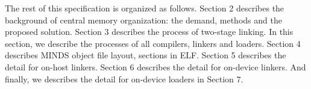The rest of this specification is organized as follows. Section 2 describes the background of central memory organization: the demand, methods and the proposed solution. Section 3 describes the process of two-stage linking. In this section, we describe the processes of all compilers, linkers and loaders. Section 4 describes MINDS object file layout, sections in ELF. Section 5 describes the detail for on-host linkers. Section 6 describes the detail for on-device linkers. And finally, we describes the detail for on-device loaders in Section 7.
